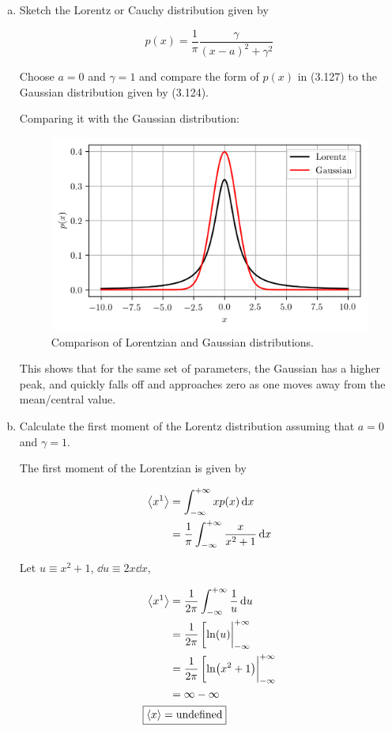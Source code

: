 \documentclass[9pt,a4paper,twocolumn]{article}
\begin{document}
\begin{enumerate}[(a)]

\item Sketch the Lorentz or Cauchy distribution given by

\begin{equation}\label{eq:lorentz}
	p(x) = \frac{1}{\pi}\frac{\gamma}{(x-a)^2 + \gamma^2}
\end{equation}

Choose $a = 0$ and $\gamma = 1$ and compare the form of $p(x)$ in (3.127) to the Gaussian distribution given by (3.124).

Comparing it with the Gaussian distribution:

\begin{figure}[!h]
	\centering
	\includegraphics[width=0.75\linewidth]{lorentz.png}
	\caption{Comparison of Lorentzian and Gaussian distributions.}
	\label{fig:compare}
\end{figure}

This shows that for the same set of parameters, the Gaussian has a higher peak, and quickly falls off and approaches zero as one moves away from the mean/central value.

\item Calculate the first moment of the Lorentz distribution assuming that $a = 0$ and $\gamma = 1$.

The first moment of the Lorentzian is given by

\begin{align}
	\ev{x^1} &= \int_{-\infty}^{+\infty} xp(x) \dd{x} \\
	&= \frac{1}{\pi} \int_{-\infty}^{+\infty} \frac{x}{x^2 + 1} \dd{x} \nonumber
\end{align}

Let $u \equiv x^2 + 1$, $\dd{u} \equiv 2x\dd{x}$,

\begin{align}
	\ev{x^1} &= \frac{1}{2\pi} \int_{-\infty}^{+\infty} \frac{1}{u}\dd{u} \nonumber \\
	&= \frac{1}{2\pi} \eval[\ln(u)|_{-\infty}^{+\infty} \nonumber \\
	&= \frac{1}{2\pi} \eval[\ln(x^2 + 1)|_{-\infty}^{+\infty} \nonumber \\
	&= \infty - \infty \nonumber \\
	\Aboxed{
		\ev{x} &= \mathrm{undefined}
	} \label{eq:answer-b}
\end{align}


\end{enumerate}
\end{document}
